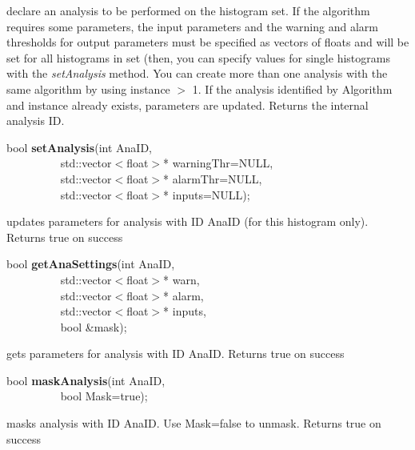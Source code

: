  declare an analysis to be performed on the histogram set. If the algorithm
 requires some parameters, the input parameters and the warning and alarm 
 thresholds for output parameters must be
 specified as vectors of floats and will be set for all histograms in
 set (then, you can specify values for single histograms with the {\it
 setAnalysis} method. 
 You can create more than one analysis
 with the same algorithm by using instance $>$ 1. If the analysis
 identified by Algorithm and instance already exists, parameters are
 updated. Returns the internal analysis ID.


\item    bool {\bf setAnalysis}(int AnaID,\\\mbox{}~~~~~~~~~ 
                   std::vector$<$float$>$* warningThr=NULL,\\\mbox{}~~~~~~~~~ 
                   std::vector$<$float$>$* alarmThr=NULL,\\\mbox{}~~~~~~~~~ 
                   std::vector$<$float$>$* inputs=NULL);

 updates parameters for analysis with ID AnaID (for this histogram only). Returns true on success


\item    bool {\bf getAnaSettings}(int AnaID,\\\mbox{}~~~~~~~~~
                      std::vector$<$float$>$* warn,\\\mbox{}~~~~~~~~~ 
                      std::vector$<$float$>$* alarm,\\\mbox{}~~~~~~~~~
                      std::vector$<$float$>$* inputs,\\\mbox{}~~~~~~~~~
                      bool \&mask);

 gets parameters for analysis with ID AnaID. Returns true on success


\item    bool {\bf maskAnalysis}(int AnaID,\\\mbox{}~~~~~~~~~
                    bool Mask=true);

 masks analysis with ID AnaID. Use Mask=false to unmask. Returns true on success


